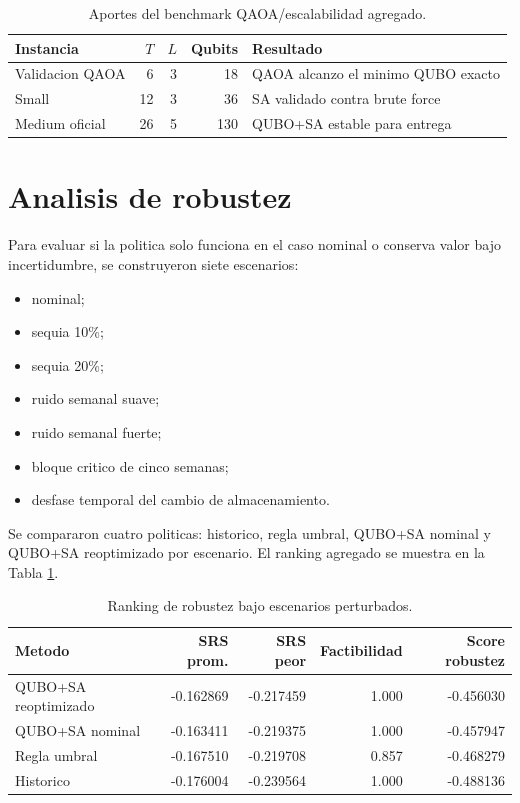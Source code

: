 \documentclass[11pt,letterpaper]{article}
\begin{document}
\begin{table}[H]
\centering
\caption{Aportes del benchmark QAOA/escalabilidad agregado.}
\begin{tabular}{lrrrl}
\toprule
Instancia & $T$ & $L$ & Qubits & Resultado \\
\midrule
Validacion QAOA & 6 & 3 & 18 & QAOA alcanzo el minimo QUBO exacto \\
Small & 12 & 3 & 36 & SA validado contra brute force \\
Medium oficial & 26 & 5 & 130 & QUBO+SA estable para entrega \\
\bottomrule
\end{tabular}
\end{table}

\section{Analisis de robustez}

Para evaluar si la politica solo funciona en el caso nominal o conserva valor
bajo incertidumbre, se construyeron siete escenarios:

\begin{itemize}
  \item nominal;
  \item sequia 10\%;
  \item sequia 20\%;
  \item ruido semanal suave;
  \item ruido semanal fuerte;
  \item bloque critico de cinco semanas;
  \item desfase temporal del cambio de almacenamiento.
\end{itemize}

Se compararon cuatro politicas: historico, regla umbral, QUBO+SA nominal y
QUBO+SA reoptimizado por escenario. El ranking agregado se muestra en la
Tabla \ref{tab:robustez}.

\begin{table}[H]
\centering
\caption{Ranking de robustez bajo escenarios perturbados.}
\label{tab:robustez}
\begin{tabular}{lrrrr}
\toprule
Metodo & SRS prom. & SRS peor & Factibilidad & Score robustez \\
\midrule
QUBO+SA reoptimizado & -0.162869 & -0.217459 & 1.000 & -0.456030 \\
QUBO+SA nominal & -0.163411 & -0.219375 & 1.000 & -0.457947 \\
Regla umbral & -0.167510 & -0.219708 & 0.857 & -0.468279 \\
Historico & -0.176004 & -0.239564 & 1.000 & -0.488136 \\
\bottomrule
\end{tabular}
\end{table}
\end{document}

